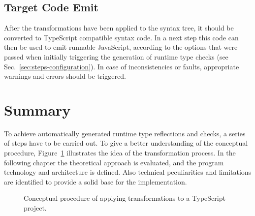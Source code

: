 \subsection{Target Code Emit}

After the transformations have been applied to the syntax tree, it should be converted to TypeScript compatible syntax code. In a next step this code can then be used to emit runnable JavaScript, according to the options that were passed when initially triggering the generation of runtime type checks (see Sec.~\ref{sec:steps-configuration}). In case of inconsistencies or faults, appropriate warnings and errors should be triggered.

\section{Summary}
\label{sec:theoretical-approach-summary}

To achieve automatically generated runtime type reflections and checks, a series of steps have to be carried out. To give a better understanding of the conceptual procedure, Figure~\ref{fig:theoretical-approach} illustrates the idea of the transformation process. In the following chapter the theoretical approach is evaluated, and the program technology and architecture is defined. Also technical peculiarities and limitations are identified to provide a solid base for the implementation.
\begin{figure}
\centering

\caption{Conceptual procedure of applying transformations to a TypeScript project.}
\label{fig:theoretical-approach}
\end{figure}


%

